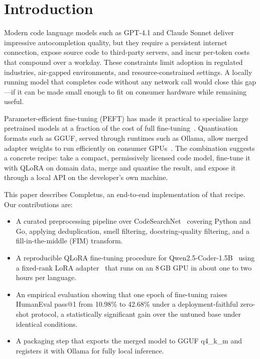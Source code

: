 \section{Introduction}

Modern code language models such as GPT-4.1 and Claude Sonnet deliver
impressive autocompletion quality, but they require a persistent
internet connection, expose source code to third-party servers, and
incur per-token costs that compound over a workday. These constraints
limit adoption in regulated industries, air-gapped environments, and
resource-constrained settings. A locally running model that completes
code without any network call would close this gap---if it can be made
small enough to fit on consumer hardware while remaining useful.

Parameter-efficient fine-tuning (PEFT) has made it practical to
specialise large pretrained models at a fraction of the cost of full
fine-tuning~\cite{Hu2021LoRA, Dettmers2023QLoRA}. Quantisation
formats such as GGUF, served through runtimes such as Ollama, allow
merged adapter weights to run efficiently on consumer
GPUs~\cite{Kurt2026Quant}. The combination suggests a concrete recipe:
take a compact, permissively licensed code model, fine-tune it with
QLoRA on domain data, merge and quantise the result, and expose it
through a local API on the developer's own machine.

This paper describes Completus, an end-to-end implementation of that
recipe. Our contributions are:
\begin{itemize}[leftmargin=14.4pt]
  \item A curated preprocessing pipeline over
        CodeSearchNet~\cite{Husain2019CSN} covering Python and Go,
        applying deduplication, smell filtering, docstring-quality
        filtering, and a fill-in-the-middle (FIM) transform.
  \item A reproducible QLoRA fine-tuning procedure for
        Qwen2.5-Coder-1.5B~\cite{Hui2024Qwen25} using a fixed-rank
        LoRA adapter~\cite{Hu2021LoRA} that runs on an 8\,GB GPU in
        about one to two hours per language.
  \item An empirical evaluation showing that one epoch of fine-tuning
        raises HumanEval pass@1 from 10.98\% to 42.68\% under a
        deployment-faithful zero-shot protocol, a statistically
        significant gain over the untuned base under identical
        conditions.
  \item A packaging step that exports the merged model to GGUF
        q4\_k\_m and registers it with Ollama for fully local
        inference.
\end{itemize}
